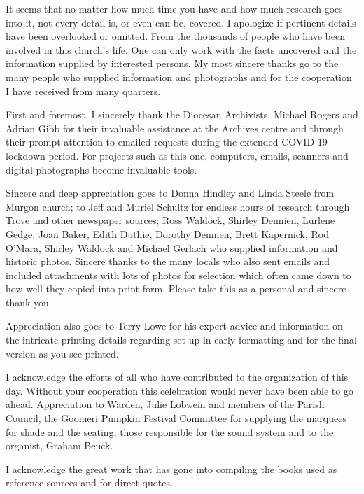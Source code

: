It seems that no matter how much time you have and how much research goes into it, not every detail is, or even can be, covered. I apologize if pertinent details have been overlooked or omitted. From the thousands of people who have been involved in this church's life. One can only work with the facts uncovered and the information supplied by interested persons. My most sincere thanks go to the many people who supplied information and photographs and for the cooperation I have received from many quarters.



First and foremost, I sincerely thank the Diocesan Archivists, Michael Rogers and Adrian Gibb for their invaluable assistance at the Archives centre and through their prompt attention to emailed requests during the extended COVID-19 lockdown period. For projects such as this one, computers, emails, scanners and digital photographs become invaluable tools.



Sincere and deep appreciation goes to Donna Hindley and Linda Steele from Murgon church; to Jeff and Muriel Schultz for endless hours of research through Trove and other newspaper sources; Ross Waldock, Shirley Dennien, Lurlene Gedge, Joan Baker, Edith Duthie, Dorothy Dennien, Brett Kapernick, Rod O'Mara, Shirley Waldock and Michael Gerlach who supplied information and historic photos. Sincere thanks to the many locals who also sent emails and included attachments with lots of photos for selection which often came down to how well they copied into print form. Please take this as a personal and sincere thank you.



Appreciation also goes to Terry Lowe for his expert advice and information on the intricate printing details regarding set up in early formatting and for the final version as you see printed.



I acknowledge the efforts of all who have contributed to the organization of this day. Without your cooperation this celebration would never have been able to go ahead. Appreciation to Warden, Julie Lobwein and members of the Parish Council, the Goomeri Pumpkin Festival Committee for supplying the marquees for shade and the seating, those responsible for the sound system and to the organist, Graham Beuck.



I acknowledge the great work that has gone into compiling the books used as reference sources and for direct quotes.



